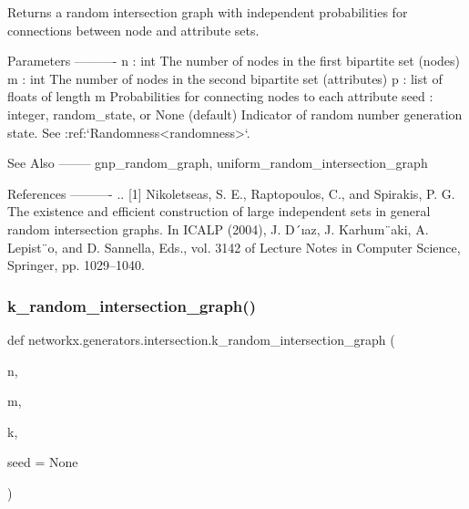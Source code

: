 \begin{DoxyVerb}Returns a random intersection graph with independent probabilities
for connections between node and attribute sets.

Parameters
----------
n : int
    The number of nodes in the first bipartite set (nodes)
m : int
    The number of nodes in the second bipartite set (attributes)
p : list of floats of length m
    Probabilities for connecting nodes to each attribute
seed : integer, random_state, or None (default)
    Indicator of random number generation state.
    See :ref:`Randomness<randomness>`.

See Also
--------
gnp_random_graph, uniform_random_intersection_graph

References
----------
.. [1] Nikoletseas, S. E., Raptopoulos, C., and Spirakis, P. G.
   The existence and efficient construction of large independent sets
   in general random intersection graphs. In ICALP (2004), J. D´ıaz,
   J. Karhum¨aki, A. Lepist¨o, and D. Sannella, Eds., vol. 3142
   of Lecture Notes in Computer Science, Springer, pp. 1029–1040.
\end{DoxyVerb}
 \mbox{\label{namespacenetworkx_1_1generators_1_1intersection_af5f9931087609ac41027efa75eab9765}} 
\subsubsection{\texorpdfstring{k\+\_\+random\+\_\+intersection\+\_\+graph()}{k\_random\_intersection\_graph()}}
{\footnotesize\ttfamily def networkx.\+generators.\+intersection.\+k\+\_\+random\+\_\+intersection\+\_\+graph (\begin{DoxyParamCaption}\item[{}]{n,  }\item[{}]{m,  }\item[{}]{k,  }\item[{}]{seed = {\ttfamily None} }\end{DoxyParamCaption})}

